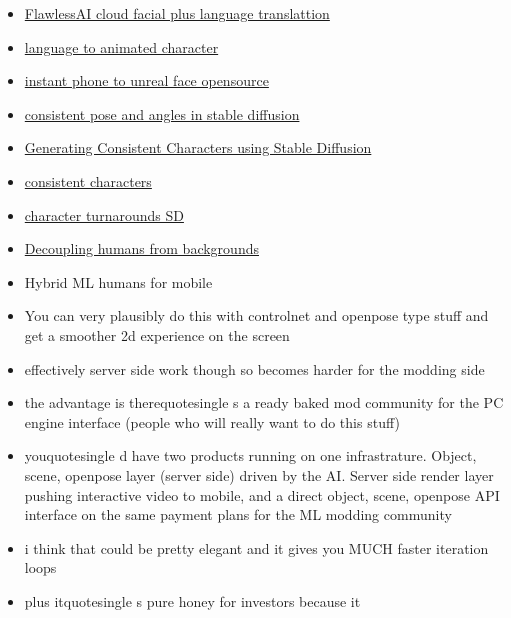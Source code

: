 \begin{itemize}
\begin{itemize}
  \item
    \href{https://www.flawlessai.com/}{FlawlessAI cloud facial plus
    language translattion}
  \item
    \href{https://masterpiecestudio.com/blog/announcing-generative-animations}{language
    to animated character}
  \item
    \href{https://github.com/JimWest/MeFaMo}{instant phone to unreal
    face opensource}
  \item
    \href{https://www.youtube.com/watch?v=zgj24gTjQtY}{consistent pose
    and angles in stable diffusion}
  \item
    \href{https://www.youtube.com/watch?v=XWJGmNW15A4}{Generating
    Consistent Characters using Stable Diffusion}
  \item
    \href{https://www.youtube.com/watch?v=Ig1S2guCfKM}{consistent
    characters}
  \item
    \href{https://www.youtube.com/watch?v=-iwPVUzAWzk}{character
    turnarounds SD}
  \item
    \href{https://github.com/vye16/slahmr}{Decoupling humans from
    backgrounds}
  \item
    Hybrid ML humans for mobile
  \item
    \hypertarget{message-content-1079000811318812742}{}
    You can very plausibly do this with controlnet and openpose type
    stuff and get a smoother 2d experience on the screen
  \item
    \hypertarget{message-content-1079000989610283130}{}
    effectively server side work though so becomes harder for the
    modding side
  \item
    \hypertarget{message-content-1079001213984591922}{}
    the advantage is therequotesingle s a ready baked mod community
    for the PC engine interface (people who will really want to do this
    stuff)
  \item
    \hypertarget{message-content-1079001578956132422}{}
    youquotesingle d have two products running on one
    infrastrature. Object, scene, openpose layer (server side) driven by
    the AI. Server side render layer pushing interactive video to
    mobile, and a direct object, scene, openpose API interface on the
    same payment plans for the ML modding community
  \item
    \hypertarget{message-content-1079001659209945199}{}
    i think that could be pretty elegant and it gives you MUCH faster
    iteration loops
  \item
    plus itquotesingle s pure honey for investors because it

\end{itemize}
\end{itemize}
